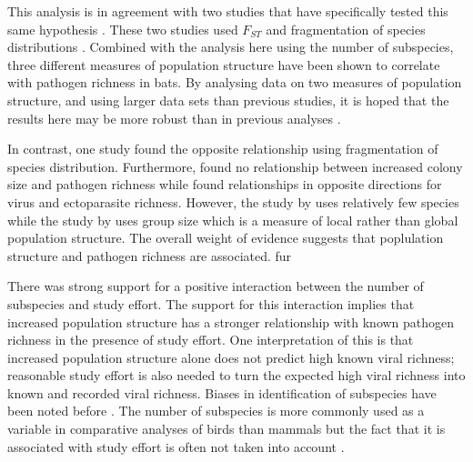 This analysis is in agreement with two studies that have specifically tested this same hypothesis \cite{turmelle2009correlates, maganga2014bat}.
These two studies used $F_{ST}$ \cite{turmelle2009correlates} and fragmentation of species distributions \cite{maganga2014bat}.
Combined with the analysis here using the number of subspecies, three different measures of population structure have been shown to correlate with pathogen richness in bats.
By analysing data on two measures of population structure, and using larger data sets than previous studies, it is hoped that the results here may be more robust than in previous analyses \cite{gay2014parasite, turmelle2009correlates, maganga2014bat}.



In contrast, one study \textcite{gay2014parasite} found the opposite relationship using fragmentation of species distribution.
Furthermore, \textcite{bordes2008bat} found no relationship between increased colony size and pathogen richness while \textcite{gay2014parasite} found relationships in opposite directions for virus and ectoparasite richness.
However, the study by \textcite{gay2014parasite} uses relatively few species while the study by \textcite{bordes2008bat} uses group size which is a measure of local rather than global population structure.
The overall weight of evidence suggests that poplulation structure and pathogen richness are associated.
fur





There was strong support for a positive interaction between the number of subspecies and study effort.
The support for this interaction implies that increased population structure has a stronger relationship with known pathogen richness in the presence of study effort.
One interpretation of this is that increased population structure alone does not predict high known viral richness; reasonable study effort is also needed to turn the expected high viral richness into known and recorded viral richness.
Biases in identification of subspecies have been noted before \cite{gippoliti2007problem}.
The number of subspecies is more commonly used as a variable in comparative analyses of birds than mammals but the fact that it is associated with study effort is often not taken into account \cite{phillimore2007biogeographical, belliure2000dispersal}.

